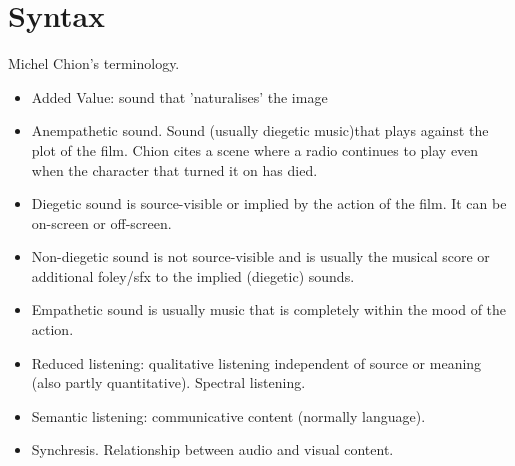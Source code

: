 
\chapter{Syntax}
\label{syntax}

Michel Chion's terminology.
\begin{itemize}
\item Added Value: sound that 'naturalises' the image
\item Anempathetic sound. Sound (usually diegetic music)that plays against the plot of the film. Chion cites a scene where a radio continues to play even when the character that turned it on has died.
\item Diegetic sound is source-visible or implied by the action of the film. It can be on-screen or off-screen.
\item Non-diegetic sound is not source-visible and is usually the musical score or additional foley/sfx to the implied (diegetic) sounds.
\item Empathetic sound is usually music that is completely within the mood of the action.
\item Reduced listening: qualitative listening independent of source or meaning (also partly quantitative). Spectral listening.
\item Semantic listening: communicative content (normally language).
\item Synchresis. Relationship between audio and visual content.
\end{itemize}
